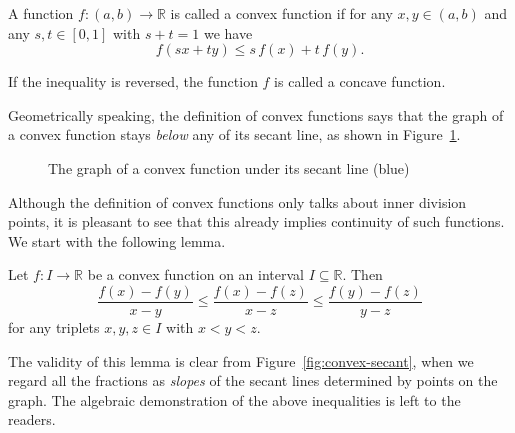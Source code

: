 \begin{defn}
  A function $f: (a,b) \to \mathbb{R}$ is called a \textsf{convex function} if for any $x,y \in (a,b)$ and any $s, t \in [0,1]$ with $s + t = 1$ we have
  \[
    f(sx + ty) \leqslant s \, f(x) + t \, f(y).
  \]
  
  If the inequality is reversed, the function $f$ is called a \textsf{concave function}.
\end{defn}

Geometrically speaking, the definition of convex functions says that the graph of a convex function stays \textit{below} any of its secant line, as shown in Figure~\ref{fig:convex}.

\begin{figure}
  \centering
  \caption{The graph of a convex function under its secant line (blue)}
  \label{fig:convex}
\end{figure}

Although the definition of convex functions only talks about inner division points, it is pleasant to see that this already implies continuity of such functions.
We start with the following lemma.

\begin{lem}
  Let $f : I \to \mathbb{R}$ be a convex function on an interval $I \subseteq \mathbb{R}$.
  Then
  \[
    \frac{ f(x) - f(y) }{ x - y } \leqslant \frac{ f(x) - f(z) }{ x - z } \leqslant \frac{ f(y) - f(z) }{ y - z }
  \]
  for any triplets $x, y, z \in I$ with $x < y < z$.
\end{lem}

The validity of this lemma is clear from Figure~\ref{fig:convex-secant}, when we regard all the fractions as {\em slopes} of the secant lines determined by points on the graph.
The algebraic demonstration of the above inequalities is left to the readers.


